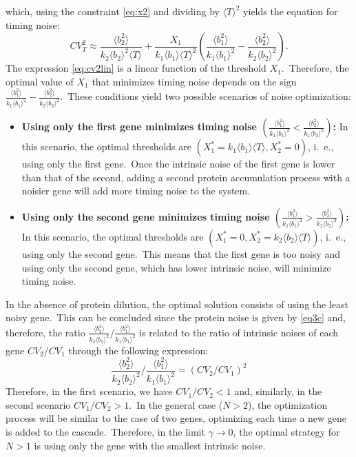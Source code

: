 \documentclass[aps,prb,reprint,superscriptaddress]{revtex4-2}
\begin{document}
which, using the constraint \eqref{eq:x2} and dividing by $\langle T\rangle^2$ yields the equation for timing noise:
\begin{equation}\label{eq:cv2lin}
    CV^2_T\approx\frac{\langle b^2_2\rangle}{k_2\langle b_2\rangle^2\langle T\rangle}+\frac{X_1}{k_1\langle b_1\rangle\langle T\rangle^2}\left(\frac{\langle b^2_1\rangle}{k_1\langle b_1\rangle^2}-\frac{\langle b^2_2\rangle}{ k_2\langle b_2\rangle^2}\right).
\end{equation}
The expression \eqref{eq:cv2lin} is a linear function of the threshold $X_1$.~Therefore, the optimal value of $X_1$ that minimizes timing noise depends on the sign $\frac{\langle b^2_1\rangle}{k_1\langle b_1\rangle^2}-\frac{\langle b^2_2\rangle}{ k_2\langle b_2\rangle^2}$.~These conditions yield two possible scenarios of noise optimization:
\begin{itemize}
    \item \textbf{Using only the first gene minimizes timing noise $\left(\frac{\langle b^2_1\rangle}{k_1\langle b_1\rangle^2}<\frac{\langle b^2_2\rangle}{ k_2\langle b_2\rangle^2}\right)$:} In this scenario, the optimal thresholds are $(X_1^*=k_1\langle b_1\rangle\langle T\rangle, X_2^*=0)$, i.~e., using only the first gene.~Once the intrinsic noise of the first gene is lower than that of the second, adding a second protein accumulation process with a noisier gene will add more timing noise to the system.
    \item \textbf{Using only the second gene minimizes timing noise $\left(\frac{\langle b^2_1\rangle}{k_1\langle b_1\rangle^2}>\frac{\langle b^2_2\rangle}{ k_2\langle b_2\rangle^2}\right)$:} In this scenario, the optimal thresholds are $(X_1^*=0, X_2^*=k_2\langle b_2\rangle\langle T\rangle)$, i.~e., using only the second gene.~This means that the first gene is too noisy and using only the second gene, which has lower intrinsic noise, will minimize timing noise.
\end{itemize}

In the absence of protein dilution, the optimal solution consists of using the least noisy gene.~This can be concluded since the protein noise is given by \eqref{eq3c} and, therefore, the ratio $\frac{\langle b^2_2\rangle}{k_2\langle b_2\rangle^2}/\frac{\langle b^2_1\rangle}{ k_1\langle b_1\rangle^2}$ is related to the ratio of intrinsic noises of each gene $CV_2/CV_1$ through the following expression:
\begin{equation}
    \frac{\langle b^2_2\rangle}{k_2\langle b_2\rangle^2}/\frac{\langle b^2_1\rangle}{ k_1\langle b_1\rangle^2}=\left(CV_2/CV_1\right)^2
\end{equation}
Therefore, in the first scenario, we have ${CV_1/CV_2<1}$ and, similarly, in the second scenario ${CV_1/CV_2>1}$.~In the general case ($N>2$), the optimization process will be similar to the case of two genes, optimizing each time a new gene is added to the cascade.~Therefore, in the limit $\gamma \to 0$, the optimal strategy for $N > 1$ is using only the gene with the smallest intrinsic noise.
\end{document}
